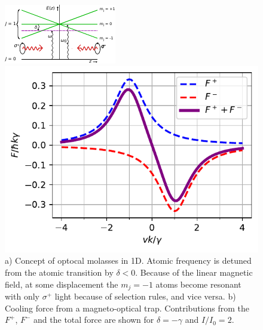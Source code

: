 \begin{figure}
\centering
	\begin{minipage}{.49\textwidth}
		\centering
		\includegraphics[width=\linewidth]{figures/OpticalMolasses.pdf}
	\end{minipage}
	\begin{minipage}{.48\textwidth}
		\centering
		\includegraphics[width=\linewidth]{figures/MOTplot.pdf}
	\end{minipage}
	\caption{a) Concept of optocal molasses in 1D. Atomic frequency is detuned from the atomic transition by $\delta<0$. Because of the linear magnetic field, at some displacement the $m_j=-1$ atoms become resonant with only $\sigma^+$ light because of selection rules, and vice versa. b) Cooling force from a magneto-optical trap. Contributions from the $F^+$, $F^-$ and the total force are shown for $\delta = -\gamma$ and $I/I_0 = 2.$}
		\label{fig:MOTdamping}
\end{figure}

